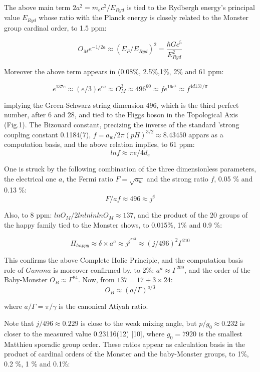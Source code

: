 \documentclass[twoside,draft]{article}
\begin{document}
\begin{sloppypar}
{The above main term $2a^{2} = m_{e} c^{2}/E_{Ryd}$ is
tied to the Rydbergh energy's principal value $E_{Ryd}$ whose ratio with the Planck energy is closely
related to the Monster group cardinal order, to 1.5 ppm:

\begin{equation}
O_{M} e^{-1/2a} \approx (E_{P} /E_{Ryd})^{2} = \frac{\hbar Gc^{5}}{E_{Ryd}^{2}}
\end{equation}

Moreover the above term appears in (0.08\%, 2.5\%,1\%, 2\% and 61 ppm:

$$e^{137e}\approx (e/3)e^{ea}\approx O_M^3 \approx 496^{60} \approx fe^{16e^\pi} \approx f^{4d137/\pi}$$

implying the Green-Schwarz string dimension 496, which is the third perfect number, after 6 and 28, and tied to the Higgs boson in the Topological Axis (Fig.1). The Bizouard constant, precizing the inverse of the standard 'strong coupling constant 0.1184(7), $f = a_w/2\pi(pH)^{3/2} \approx 8.43450$ appars as a computation basis, and the above relation implies, to 61 ppm:
\begin{equation}
lnf\approx \pi e/4d_e
\end{equation}

One is struck by the following combination of the three dimensionless parameters, the electrical
one $a$, the Fermi ratio $F =\sqrt{a_{w}}$ and the strong ratio $f$, 0.05 \% and 0.13 \%:
\begin{equation}
F/af \approx 496\approx j^{\delta}
\end{equation}


Also, to 8 ppm: $lnO_{M} /2lnlnlnlnO_{M} \approx 137$, and the product of the 20 groups of the happy family tied
to the Monster shows, to 0.015\%, 1\% and 0.9 \%:

$$\Pi_{happy} \approx \delta \times a^{a} \approx j^{j^{\pi/3}} \approx (j/496)^2 \Gamma^{210}$$

This confirms the above Complete Holic Principle, and the computation basis role of $Gamma$ is moreover confirmed by, to 2\%: $a^a \approx \Gamma^{209}$, and the order of the Baby-Monster $O_B\approx\Gamma^{24}$. Now, from $137 = 17 + 3\times 24$:
\begin{equation}
O_B \approx (a/\Gamma)^{a/3}
\end{equation}

where $a/\Gamma = \pi/\gamma $ is the canonical Atiyah ratio.


Note that $j/496 \approx 0.229$ is close to the weak mixing angle, but $p/g_0 \approx 0.232$ is closer to the measured value 0.23116(12) [10], where $g_0 = 7920 $ is the smallest Matthieu sporadic group order. These ratios appear as calculation basis in the product of cardinal orders of the Monster and the baby-Monster groups, to 1\%, 0.2 \%, 1 \% and 0.1\%:

}
\end{sloppypar}
\end{document}
